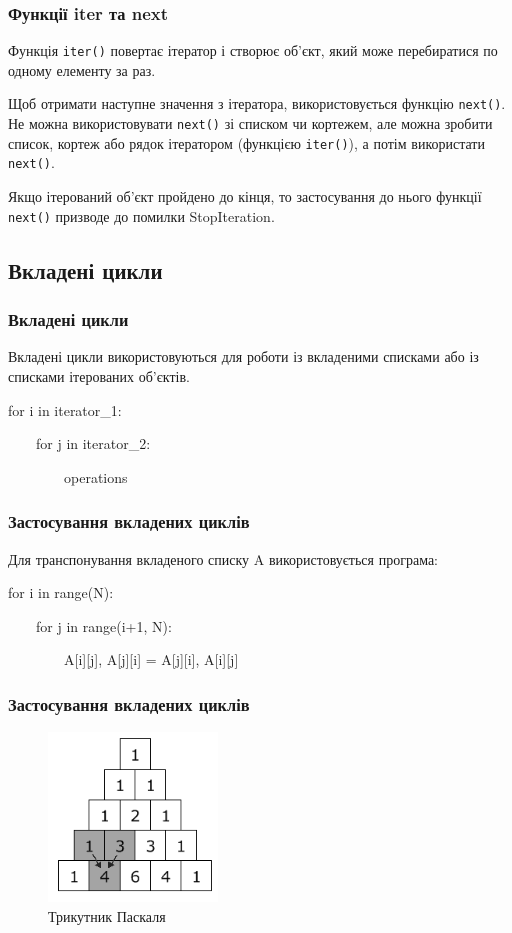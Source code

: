 \begin{frame}
\frametitle{Функції iter та next}
Функція \texttt{iter()} повертає ітератор і створює об'єкт, який може перебиратися по одному елементу за раз.

Щоб отримати наступне значення з ітератора, використовується функцію \texttt{next()}. Не можна використовувати \texttt{next()} зі списком чи кортежем, але можна зробити список, кортеж або рядок ітератором (функцією \texttt{iter()}), а потім використати \texttt{next()}.

Якщо ітерований об'єкт пройдено до кінця, то застосування до нього функції \texttt{next()} призводе до помилки StopIteration.
\end{frame}

\subsection{Вкладені цикли} 
\begin{frame}
\frametitle{Вкладені цикли}
Вкладені цикли використовуються для роботи із вкладеними списками або із списками ітерованих об'єктів.

\huge{
for i in iterator\_1:

~~~~for j in iterator\_2:

~~~~~~~~operations
}
\end{frame}

\begin{frame}
\frametitle{Застосування вкладених циклів}
Для транспонування вкладеного списку A  використовується програма:

for i in range(N):

~~~~for j in range(i+1, N):

~~~~~~~~A[i][j], A[j][i] = A[j][i], A[i][j]
\end{frame}

\begin{frame}
\frametitle{Застосування вкладених циклів}
\begin{figure}
\begin{center}
 \includegraphics[width=0.4\textwidth]{pictures/pascal.png}
\caption{Трикутник Паскаля}
\label{pascal} 
\end{center}
\end{figure}
\end{frame}
